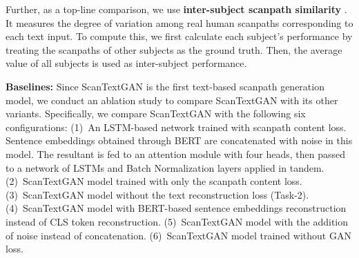 Further, as a top-line comparison, we use \textbf{inter-subject scanpath similarity} \cite{sun2019visual}. It measures the degree of variation among real human scanpaths corresponding to each text input. To compute this, we first calculate each subject's performance by treating the scanpaths of other subjects as the ground truth. Then, the average value of all subjects is used as inter-subject performance.


\textbf{Baselines:} Since ScanTextGAN is the first text-based scanpath generation model, we conduct an ablation study to compare ScanTextGAN with its other variants. Specifically, we compare ScanTextGAN with the following six configurations: (1)~An LSTM-based network trained with scanpath content loss. Sentence embeddings obtained through BERT are concatenated with noise in this model. The resultant is fed to an attention module with four heads, then passed to a network of LSTMs and Batch Normalization layers applied in tandem. (2)~ScanTextGAN model trained with only the scanpath content loss. (3)~ScanTextGAN model without the text reconstruction loss (Task-2). (4)~ScanTextGAN model with BERT-based sentence embeddings reconstruction instead of CLS token reconstruction. (5)~ScanTextGAN model with the addition of noise instead of concatenation. (6)~ScanTextGAN model trained without GAN loss.



